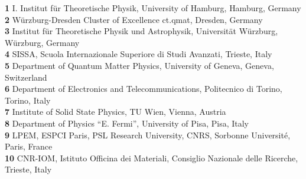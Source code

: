 \documentclass[dvipsnames]{SciPost}
\begin{document}
\begin{center}
%
%
  \newcommand{\CNRIOM}{CNR-IOM, Istituto Officina dei Materiali,
  Consiglio Nazionale delle Ricerche, Trieste, Italy}
\newcommand{\SISSA}{SISSA, Scuola Internazionale Superiore di Studi Avanzati, Trieste, Italy}
\newcommand{\ITPHamburg}{I. Institut f\"ur Theoretische Physik,
  University of Hamburg, Hamburg, Germany}
\newcommand{\WZBURG}{Institut f\"ur Theoretische Physik und
  Astrophysik, Universit\"at W\"urzburg, W\"urzburg, Germany}
\newcommand{\CTQMAT}{W\"urzburg-Dresden Cluster of Excellence ct.qmat, Dresden, Germany}
\newcommand{\Geneve}{Department of Quantum Matter Physics, University of
  Geneva, Geneva, Switzerland}
\newcommand{\UPISA}{Department of Physics ``E. Fermi'', University of
  Pisa, Pisa, Italy}
\newcommand{\ESPCI}{LPEM, ESPCI Paris, PSL Research University, CNRS, Sorbonne Universit\'e, Paris, France}
\newcommand{\TUW}{Institute of Solid State Physics, TU Wien, Vienna, Austria}
\newcommand{\ToPoli}{Department of Electronics and Telecommunications, Politecnico di Torino, Torino, Italy}
{\small
{\bf 1} \ITPHamburg\\
{\bf 2} \CTQMAT\\
{\bf 3} \WZBURG\\
{\bf 4} \SISSA\\
{\bf 5} \Geneve\\
{\bf 6} \ToPoli\\
{\bf 7} \TUW\\   
{\bf 8} \UPISA\\
{\bf 9} \ESPCI\\
{\bf 10} \CNRIOM\\
}
\end{center}
\end{document}
